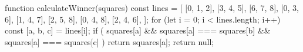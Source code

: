 function calculateWinner(squares) {
	const lines = [
		[0, 1, 2],
		[3, 4, 5],
		[6, 7, 8],
		[0, 3, 6],
		[1, 4, 7],
		[2, 5, 8],
		[0, 4, 8],
		[2, 4, 6],
	];
	for (let i = 0; i < lines.length; i++) {
		const [a, b, c] = lines[i];
		if (
			squares[a] && squares[a] === squares[b]
						&&
			squares[a] === squares[c]
		) {
			return squares[a];
		}
	}
	return null;
}
